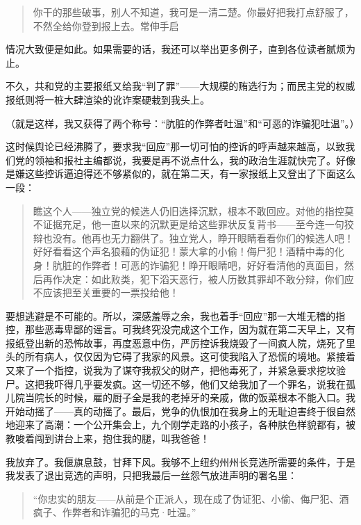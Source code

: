 \documentclass[12pt,UTF-8,openany]{ctexbook}
\begin{document}
\begin{large}
\begin{quotation}
    你干的那些破事，别人不知道，我可是一清二楚。你最好把我打点舒服了，不然全给你登到报上去。常伸手启
    
    \end{quotation}
    
    情况大致便是如此。如果需要的话，我还可以举出更多例子，直到各位读者腻烦为止。
    
    不久，共和党的主要报纸又给我“判了罪”——大规模的贿选行为；而民主党的权威报纸则将一桩大肆渲染的讹诈案硬栽到我头上。
    
    （就是这样，我又获得了两个称号：“肮脏的作弊者吐温”和“可恶的诈骗犯吐温”。）
    
    这时候舆论已经沸腾了，要求我“回应”那一切可怕的控诉的呼声越来越高，以致我们党的领袖和报社主编都说，我要是再不说点什么，我的政治生涯就快完了。好像是嫌这些控诉逼迫得还不够紧似的，就在第二天，有一家报纸上又登出了下面这么一段：
    
    \begin{quotation}
    
    瞧这个人——独立党的候选人仍旧选择沉默，根本不敢回应。对他的指控莫不证据充足，他一直以来的沉默更是给这些罪状反复背书——至今连一句狡辩也没有。他再也无力翻供了。独立党人，睁开眼睛看看你们的候选人吧！好好看看这个声名狼藉的伪证犯！蒙大拿的小偷！侮尸犯！酒精中毒的化身！肮脏的作弊者！可恶的诈骗犯！睁开眼睛吧，好好看清他的真面目，然后再作决定：如此败类，犯下滔天恶行，被人历数其罪却不敢分辩，你们应不应该把至关重要的一票投给他！
    
    \end{quotation}
    
    要想逃避是不可能的。所以，深感羞辱之余，我也着手“回应”那一大堆无稽的指控，那些恶毒卑鄙的谣言。可我终究没完成这个工作，因为就在第二天早上，又有报纸登出新的恐怖故事，再度恶意中伤，严厉控诉我烧毁了一间疯人院，烧死了里头的所有病人，仅仅因为它碍了我家的风景。这可使我陷入了恐慌的境地。紧接着又来了一个指控，说我为了谋夺我叔父的财产，把他毒死了，并紧急要求挖坟验尸。这把我吓得几乎要发疯。这一切还不够，他们又给我加了一个罪名，说我在孤儿院当院长的时候，雇的厨子全是我的老掉牙的亲戚，做的饭菜根本不能入口。我开始动摇了——真的动摇了。最后，党争的仇恨加在我身上的无耻迫害终于很自然地迎来了高潮：一个公开集会上，九个刚学走路的小孩子，各种肤色样貌都有，被教唆着闯到讲台上来，抱住我的腿，叫我爸爸！
    
    我放弃了。我偃旗息鼓，甘拜下风。我够不上纽约州州长竞选所需要的条件，于是我发表了退出竞选的声明，只把我最后一丝怨气放进声明的署名里：
    
    \begin{quotation}
    
    “你忠实的朋友——从前是个正派人，现在成了伪证犯、小偷、侮尸犯、酒疯子、作弊者和诈骗犯的马克·吐温。”
    
    \end{quotation}
    
\end{large}
\end{document}
